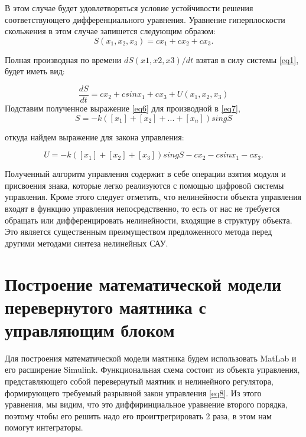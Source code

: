\noindent В этом случае будет удовлетворяться условие устойчивости решения соответствующего дифференциального уравнения.
Уравнение гиперплоскости скольжения в этом случае запишется следующим образом:
\begin{equation}\label{eq2}
    S(x_1,x_2,x_3) = cx_1+cx_2+cx_3.
\end{equation}

Полная производная по времени $dS(x1,x2,x3)/dt$ взятая в силу системы \ref{eq1}, будет иметь вид:

\begin{equation}\label{eq6}
    \frac{dS}{dt} = cx_2 + c sin{x_1} + cx_3 + U(x_1, x_2, x_3)
\end{equation}
Подставим полученное выражение \ref{eq6} для производной в \ref{eq7}, 
\begin{equation}\label{eq7}
    S = -k([x_1]+[x_2]+...+[x_n])singS
\end{equation}


\noindent откуда найдем выражение для закона управления:

\begin{equation}\label{eq8}
     U= -k([x_1]+[x_2]+[x_3])singS-cx_2-csin{x_1}-cx_3.
\end{equation}

Полученный алгоритм управления содержит в себе операции взятия модуля и присвоения знака, которые легко реализуются с помощью цифровой системы управления. Кроме этого следует отметить, что нелинейности объекта управления входят в функцию управления непосредственно, то есть от нас не требуется обращать или дифференцировать нелинейности, входящие в структуру объекта. Это является существенным преимуществом предложенного метода перед другими методами синтеза нелинейных САУ.

\section{Построение математической модели перевернутого маятника с управляющим блоком}

Для построения математической модели маятника будем использовать MatLab и его расширение Simulink. Функциональная схема состоит из объекта управления, представляющего собой перевернутый маятник и нелинейного регулятора, формирующего требуемый разрывной закон управления \ref{eq8}. Из этого уравнения, мы видим, что это диффиринциальное уравнение второго порядка, поэтому чтобы его решить надо его проигтрегрировать 2 раза, в этом нам помогут интеграторы.

